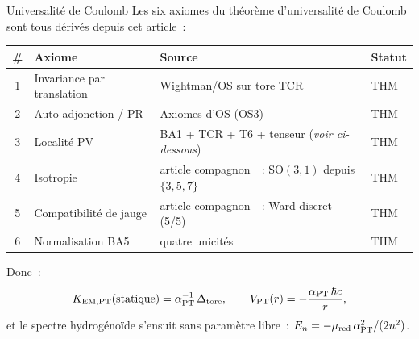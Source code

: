 \documentclass[12pt,a4paper]{article}
\begin{document}
\begin{thmbox}{Universalité de Coulomb}
\label{thm:coulomb_universality}
Les six axiomes du théorème d'universalité de Coulomb sont tous
dérivés depuis cet article~:
\begin{center}
\renewcommand{\arraystretch}{1.1}
\begin{tabular}{clll}
\toprule
\# & Axiome & Source & Statut \\
\midrule
1 & Invariance par translation & Wightman/OS sur tore TCR & THM \\
2 & Auto-adjonction / PR & Axiomes d'OS (OS3) & THM \\
3 & Localité PV & BA1 + TCR + T6 + tenseur (\emph{voir ci-dessous}) & THM \\
4 & Isotropie & article compagnon~\cite{companion_physics}~: $\mathrm{SO}(3,1)$ depuis $\{3,5,7\}$ & THM \\
5 & Compatibilité de jauge & article compagnon~\cite{companion_physics}~: Ward discret (5/5) & THM \\
6 & Normalisation BA5 & quatre unicités & THM \\
\bottomrule
\end{tabular}
\end{center}
Donc~:
\begin{equation}
  K_{\rm EM,PT}(\text{statique})
  = \alpha_{\rm PT}^{-1}\,\Delta_{\rm tore},
  \qquad
  V_{\rm PT}(r) = -\frac{\alpha_{\rm PT}\,\hbar c}{r},
  \label{eq:coulomb_id}
\end{equation}
et le spectre hydrogénoïde s'ensuit sans paramètre libre~:
$E_n = -\mu_{\rm red}\,\alpha_{\rm PT}^2/(2n^2)$.
\end{thmbox}
\end{document}
